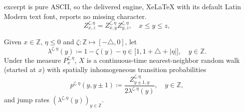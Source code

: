 \documentclass[10pt,a4paper]{amsart}
\newcommand{\Z}{\mathbb{Z}}
\begin{document}
excerpt is pure ASCII, so the delivered engine, XeLaTeX with its default Latin Modern text font, reports no missing character.
\begin{equation}\label{eq:Zxy}
  Z_{x,z}^{\zeta,\eta}=Z_{x,y}^{\zeta,\eta}Z_{y,z}^{\zeta,\eta},
  \quad x \leq y \leq z,
\end{equation}

\begin{proposition}
  \label{prop:tilted_RW}
  Given $x \in \Z $, $\eta \leq 0$ and $ \zeta: \Z \mapsto [- \triangle, 0]$,
  let
  \begin{equation}\label{eq:lambda}
    \lambda^{\zeta,\eta}(y)\coloneq1-\zeta(y)-\eta \in \big[1,1 +\triangle+ |\eta|\big],
    \quad y \in \Z.
  \end{equation}
  Under the measure $P_x^{\zeta, \eta}$, $X$ is a continuous-time
  nearest-neighbor random walk (started at $x$)  with spatially inhomogeneous
  transition probabilities
  \begin{equation}\label{eq:p_x_q_x}
    p^{\zeta, \eta}(y,y\pm1) \coloneq
    \frac{Z_{y\pm 1,y}^{\zeta,\eta}}{2\lambda^{\zeta,\eta}(y)},
    \quad y \in \Z,
  \end{equation}
  and jump rates $(\lambda^{\zeta,\eta} (y))_{y \in \Z}$.
\end{proposition}
\end{document}
